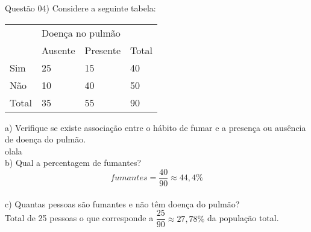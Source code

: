 
\noindent \textcolor{COLOR1}{Questão 04)} Considere a seguinte tabela:
\\

\begin{table}[ht]
    \centering
    \begin{tabular}{|l|l|l|l|}
        \hline
        \rowcolor{pagecolor!50!COLOR1}
        \multicolumn{1}{|c|}{\cellcolor{pagecolor!50!COLOR1}}                                    & \multicolumn{2}{l|}{\cellcolor{pagecolor!50!COLOR1}Doença no pulmão} & \cellcolor{pagecolor!50!COLOR1}                                                          \\ \cline{2-3}
        \rowcolor{pagecolor!50!COLOR1}
        \multicolumn{1}{|c|}{\multirow{-2}{*}{\cellcolor{pagecolor!50!COLOR1}{Hábito de fumar}}} & Ausente                                                              & Presente                        & \multirow{-2}{*}{\cellcolor{pagecolor!50!COLOR1}Total} \\ \hline
        Sim                                                                                      & 25                                                                   & 15                              & 40                                                     \\ \hline
        Não                                                                                      & 10                                                                   & 40                              & 50                                                     \\ \hline
        Total                                                                                    & 35                                                                   & 55                              & 90                                                     \\ \hline
    \end{tabular}
\end{table}


a) Verifique se existe associação entre o hábito de fumar e a presença ou ausência de doença do pulmão.
\\

olala
\\

b) Qual a percentagem de fumantes?
\\

\[
    fumantes = \frac{40}{90} \approx 44,4 \%
\]
\\

c) Quantas pessoas são fumantes e não têm doença do pulmão?
\\

Total de 25 pessoas o que corresponde a $\dfrac{25}{90} \approx 27,78\% $ da população total.
\\


